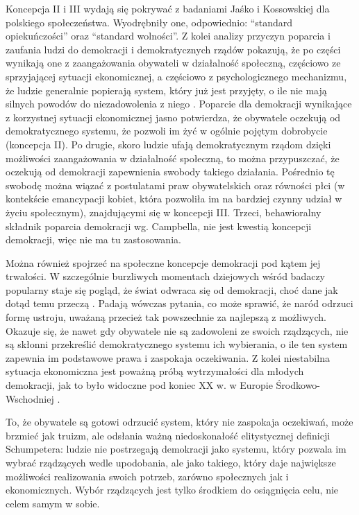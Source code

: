 \documentclass[12pt]{article}
\begin{document}
Koncepcja II i III wydają się pokrywać z badaniami Jaśko i Kossowskiej \citeyearpar{JaskoKoss} dla polskiego społeczeństwa. Wyodrębniły one, odpowiednio: ``standard opiekuńczości'' oraz ``standard wolności''. Z kolei analizy przyczyn poparcia i zaufania ludzi do demokracji i demokratycznych rządów pokazują, że po części wynikają one z zaangażowania obywateli w działalność społeczną, częściowo ze sprzyjającej sytuacji ekonomicznej, a częściowo z psychologicznego mechanizmu, że ludzie generalnie popierają system, który już jest przyjęty, o ile nie mają silnych powodów do niezadowolenia z niego \citep{Campbell}. Poparcie dla demokracji wynikające z korzystnej sytuacji ekonomicznej jasno potwierdza, że obywatele oczekują od demokratycznego systemu, że pozwoli im żyć w ogólnie pojętym dobrobycie (koncepcja II). Po drugie, skoro ludzie ufają demokratycznym rządom dzięki możliwości zaangażowania w działalność społeczną, to można przypuszczać, że oczekują od demokracji zapewnienia swobody takiego działania. Pośrednio tę swobodę można wiązać z postulatami praw obywatelskich oraz równości płci (w kontekście emancypacji kobiet, która pozwoliła im na bardziej czynny udział w życiu społecznym), znajdującymi się w koncepcji III. Trzeci, behawioralny składnik poparcia demokracji wg. Campbella, nie jest kwestią koncepcji demokracji, więc nie ma tu zastosowania.

Można również spojrzeć na społeczne koncepcje demokracji pod kątem jej trwałości. W szczególnie burzliwych momentach dziejowych wśród badaczy popularny staje się pogląd, że świat odwraca się od demokracji, choć dane jak dotąd temu przeczą \citep{Doorenspleet}. Padają wówczas pytania, co może sprawić, że naród odrzuci formę ustroju, uważaną przecież tak powszechnie za najlepszą z możliwych. Okazuje się, że nawet gdy obywatele nie są zadowoleni ze swoich rządzących, nie są skłonni przekreślić demokratycznego systemu ich wybierania, o ile ten system zapewnia im podstawowe prawa i zaspokaja oczekiwania. Z kolei niestabilna sytuacja ekonomiczna jest poważną próbą wytrzymałości dla młodych demokracji, jak to było widoczne pod koniec XX w. w Europie Środkowo-Wschodniej \citep{Klingemann}.

To, że obywatele są gotowi odrzucić system, który nie zaspokaja oczekiwań, może brzmieć jak truizm, ale odsłania ważną niedoskonałość elitystycznej definicji Schumpetera: ludzie nie postrzegają demokracji jako systemu, który pozwala im wybrać rządzących wedle upodobania, ale jako takiego, który daje największe możliwości realizowania swoich potrzeb, zarówno społecznych jak i ekonomicznych. Wybór rządzących jest tylko środkiem do osiągnięcia celu, nie celem samym w sobie.
\end{document}
